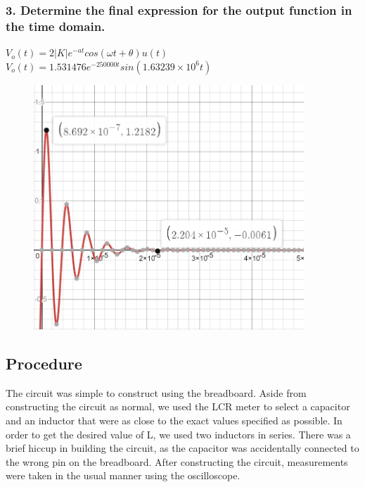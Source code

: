 \documentclass[11pt]{article}
\begin{document}
	\subsubsection*{3. Determine the final expression for the output function in the time domain.}
	$V_{o}(t)=2|K|e^{-at}cos(\omega t+\theta)u(t)$\\
	$V_{o}(t)=1.531476e^{-250000t}sin(1.63239\times 10^{6}t)$\\
	\begin{figure}[H]
		\centering
		\includegraphics[width=4in]{images/Function_Graph.png}
	\end{figure}
	
	\subsection*{Procedure}
	The circuit was simple to construct using the breadboard. Aside from constructing the circuit as normal, we used the LCR meter to select a capacitor and an inductor that were as close to the exact values specified as possible. In order to get the desired value of L, we used two inductors in series. There was a brief hiccup in building the circuit, as the capacitor was accidentally connected to the wrong pin on the breadboard. After constructing the circuit, measurements were taken in the usual manner using the oscilloscope.
\end{document}

